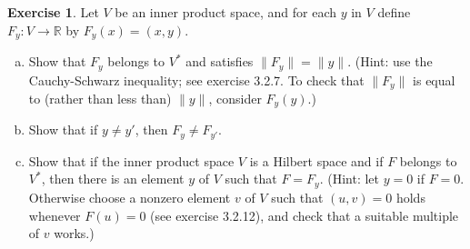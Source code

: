 \documentclass[11pt,a4paper,twoside]{article}
\theoremstyle{definition}
\newcounter{excounter}
\newtheorem{exercise}[excounter]{Exercise}
\begin{document}
\begin{exercise}

  Let $V$ be an inner product space, and for each $y$ in $V$ define $F_y : V \to \mathbb{R}$ by
  $F_y ( x ) = ( x, y )$.
  \begin{enumerate}[(a)]

  \item Show that $F_y$ belongs to $V^*$ and satisfies $\| F_y \| = \| y \|$. (Hint: use the Cauchy-Schwarz
    inequality; see exercise 3.2.7. To check that $\| F_y \|$ is equal to (rather than less than) $\| y \|$,
    consider $F_y ( y )$.)

  \item Show that if $y \neq y'$, then $F_y \neq F_{y'}$.

  \item Show that if the inner product space $V$ is a Hilbert space and if $F$ belongs to $V^*$, then there is
    an element $y$ of $V$ such that $F = F_y$. (Hint: let $y = 0$ if $F = 0$. Otherwise choose a nonzero element
    $v$ of $V$ such that $( u, v ) = 0$ holds whenever $F ( u ) = 0$ (see exercise 3.2.12), and check that
    a suitable multiple of $v$ works.)

  \end{enumerate}

\end{exercise}
\end{document}
